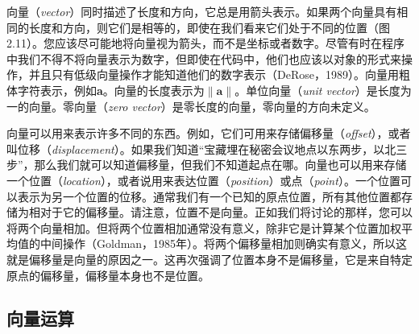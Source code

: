 
向量（\textit{vector}）同时描述了长度和方向，它总是用箭头表示。如果两个向量具有相同的长度和方向，则它们是相等的，即使在我们看来它们处于不同的位置（图 2.11）。您应该尽可能地将向量视为箭头，而不是坐标或者数字。尽管有时在程序中我们不得不将向量表示为数字，但即使在代码中，他们也应该以对象的形式来操作，并且只有低级向量操作才能知道他们的数字表示（DeRose，1989）。向量用粗体字符表示，例如\textbf{a}。向量的长度表示为$\|\mathbf{a}\|$。单位向量（\textit{unit vector}）是长度为一的向量。零向量（\textit{zero vector}）是零长度的向量，零向量的方向未定义。

向量可以用来表示许多不同的东西。例如，它们可用来存储偏移量（\textit{offset}），或者叫位移（\textit{displacement}）。如果我们知道“宝藏埋在秘密会议地点以东两步，以北三步”，那么我们就可以知道偏移量，但我们不知道起点在哪。向量也可以用来存储一个位置（\textit{location}），或者说用来表达位置（\textit{position}）或点（\textit{point}）。一个位置可以表示为另一个位置的位移。通常我们有一个已知的原点位置，所有其他位置都存储为相对于它的偏移量。请注意，位置不是向量。正如我们将讨论的那样，您可以将两个向量相加。但将两个位置相加通常没有意义，除非它是计算某个位置加权平均值的中间操作（Goldman，1985年）。将两个偏移量相加则确实有意义，所以这就是偏移量是向量的原因之一。这再次强调了位置本身不是偏移量，它是来自特定原点的偏移量，偏移量本身也不是位置。

\subsection{向量运算}

